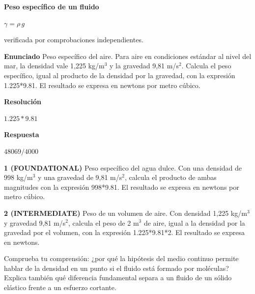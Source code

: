 \documentclass{book}
\begin{document}
\begin{tcolorbox}[title={Derivaciones}, studiumdef, breakable]

\noindent\textbf{Peso específico de un fluido}

\(\gamma = \rho\, g\)

\noindent\footnotesize verificada por comprobaciones independientes.
\end{tcolorbox}

\begin{tcolorbox}[title={Problema resuelto}, studiumworked, breakable]

\noindent\textbf{Enunciado}
Peso específico del aire. Para aire en condiciones estándar al nivel del mar, la densidad vale 1,225 kg/m\(^{3}\) y la gravedad 9,81 m/s\(^{2}\). Calcula el peso específico, igual al producto de la densidad por la gravedad, con la expresión 1.225*9.81. El resultado se expresa en newtons por metro cúbico.

\noindent\textbf{Resolución}

\(1.225*9.81\)

\noindent\textbf{Respuesta}

\(48069/4000\)
\end{tcolorbox}

\begin{tcolorbox}[title={Ejercicios}, studiumworked, breakable]

\noindent\textbf{1 (FOUNDATIONAL)}
Peso específico del agua dulce. Con una densidad de 998 kg/m\(^{3}\) y una gravedad de 9,81 m/s\(^{2}\), calcula el producto de ambas magnitudes con la expresión 998*9.81. El resultado se expresa en newtons por metro cúbico.

\noindent\textbf{2 (INTERMEDIATE)}
Peso de un volumen de aire. Con densidad 1,225 kg/m\(^{3}\) y gravedad 9,81 m/s\(^{2}\), calcula el peso de 2 m\(^{3}\) de aire, igual a la densidad por la gravedad por el volumen, con la expresión 1.225*9.81*2. El resultado se expresa en newtons.
\end{tcolorbox}

\begin{tcolorbox}[title={Autoficha}, studiumcheck, breakable]

Comprueba tu comprensión: ¿por qué la hipótesis del medio continuo permite hablar de la densidad en un punto si el fluido está formado por moléculas? Explica también qué diferencia fundamental separa a un fluido de un sólido elástico frente a un esfuerzo cortante.
\end{tcolorbox}
\end{document}
